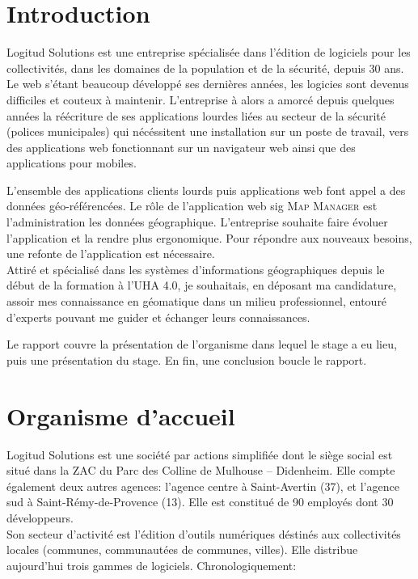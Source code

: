 \documentclass{rapportUHA40}
\begin{document}

\renewcommand{\baselinestretch}{0.9}\normalsize
\tabledematieres%
\renewcommand{\baselinestretch}{1.0}\normalsize

\setcounter{figure}{0}%


\section{Introduction}
Logitud Solutions est une entreprise spécialisée dans l'édition de logiciels
pour les collectivités, dans les domaines de la population et de la sécurité,
depuis 30 ans. Le web s'étant beaucoup développé ses dernières années, les
logicies sont devenus difficiles et couteux à maintenir. L'entreprise à alors a
amorcé depuis quelques années la réécriture de ses applications lourdes liées
au secteur de la sécurité (polices municipales) qui nécéssitent une
installation sur un poste de travail, vers des applications web fonctionnant
sur un navigateur web ainsi que des applications pour mobiles.

L'ensemble des applications clients lourds puis applications web font appel a
des données géo-référencées. Le rôle de l'application web \gls{sig} \textsc{Map
  Manager} est l'administration les données géographique. L'entreprise souhaite
faire évoluer l'application et la rendre plus ergonomique. Pour répondre aux
nouveaux besoins, une refonte de l'application est nécessaire. \\

Attiré et spécialisé dans les systèmes d'informations géographiques depuis le
début de la formation à l'UHA 4.0, je souhaitais, en déposant ma candidature,
assoir mes connaissance en géomatique dans un milieu professionnel, entouré
d'experts pouvant me guider et échanger leurs connaissances.

\vspace{2cm}

Le rapport couvre la présentation de l'organisme dans lequel le stage a eu
lieu, puis une présentation du stage. En fin, une conclusion boucle le rapport.

\newpage

\section{Organisme d'accueil}
Logitud Solutions est une société par actions simplifiée dont le siège social
est situé dans la ZAC du Parc des Colline de Mulhouse – Didenheim. Elle compte
également deux autres agences: l'agence centre à Saint-Avertin (37), et
l’agence sud à Saint-Rémy-de-Provence (13). Elle est constitué de 90 employés
dont 30 développeurs. \\ Son secteur d'activité est l'édition d'outils
numériques déstinés aux collectivités locales (communes, communautées de
communes, villes). Elle distribue aujourd'hui trois gammes de logiciels.
Chronologiquement:
\end{document}
